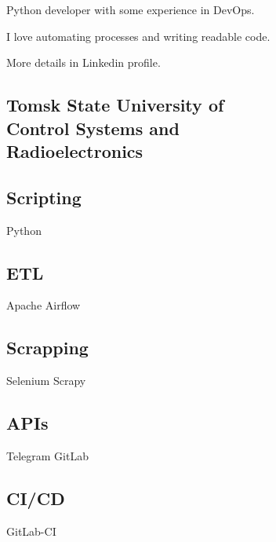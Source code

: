 \documentclass[a4paper]{MagicalCV}
\begin{document}
\lastupdated


\begin{minipage}[t]{0.33\textwidth} 


Python developer with some experience in DevOps.

I love automating processes and writing readable code.

More details in Linkedin profile.
\sectionsep




\sectionsep


\subsection{Tomsk State University of \\ Control Systems and \\ Radioelectronics}
\vspace{\topsep} %
\sectionsep


\subsection{Scripting}
Python
\subsection{ETL}
Apache Airflow
\subsection{Scrapping}
Selenium \textbullet{} 
Scrapy \textbullet{}
\subsection{APIs}
Telegram \textbullet{} 
GitLab
\subsection{CI/CD}
GitLab-CI

\end{minipage}
\end{document}
